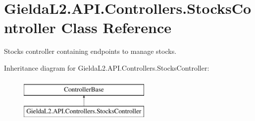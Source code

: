 \hypertarget{class_gielda_l2_1_1_a_p_i_1_1_controllers_1_1_stocks_controller}{}\section{Gielda\+L2.\+A\+P\+I.\+Controllers.\+Stocks\+Controller Class Reference}
\label{class_gielda_l2_1_1_a_p_i_1_1_controllers_1_1_stocks_controller}


Stocks controller containing endpoints to manage stocks.  


Inheritance diagram for Gielda\+L2.\+A\+P\+I.\+Controllers.\+Stocks\+Controller\+:\begin{figure}[H]
\begin{center}
\leavevmode
\includegraphics[height=2.000000cm]{class_gielda_l2_1_1_a_p_i_1_1_controllers_1_1_stocks_controller}
\end{center}
\end{figure}
